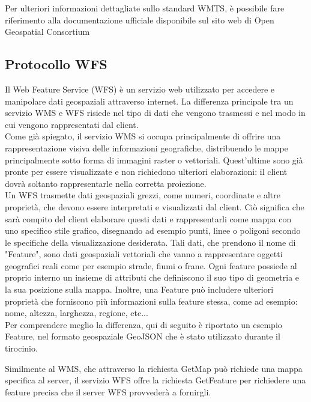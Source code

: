 
Per ulteriori informazioni dettagliate sullo standard WMTS, è possibile fare riferimento alla documentazione ufficiale disponibile sul sito web di Open Geospatial Consortium \cite{DocumentazioneWMTS}

\subsection{Protocollo WFS}

Il Web Feature Service (WFS) è un servizio web utilizzato per accedere e manipolare dati geospaziali attraverso internet. La differenza principale tra un servizio WMS e WFS risiede nel tipo di dati che vengono trasmessi e nel modo in cui vengono rappresentati dal client.
\\Come già spiegato, il servizio WMS si occupa principalmente di offrire una rappresentazione visiva delle informazioni geografiche, distribuendo le mappe principalmente sotto forma di immagini raster o vettoriali. Quest'ultime sono già pronte per essere visualizzate e non richiedono ulteriori elaborazioni: il client dovrà soltanto rappresentarle nella corretta proiezione.
\\Un WFS trasmette dati geospaziali grezzi, come numeri, coordinate e altre proprietà, che devono essere interpretati e visualizzati dal client. Ciò significa che sarà compito del client elaborare questi dati e rappresentarli come mappa con uno specifico stile grafico, disegnando ad esempio punti, linee o poligoni secondo le specifiche della visualizzazione desiderata. Tali dati, che prendono il nome di "Feature", sono dati geospaziali vettoriali che vanno a rappresentare oggetti geografici reali come per esempio strade, fiumi o frane. Ogni feature possiede al proprio interno un insieme di attributi che definiscono il suo tipo di geometria e la sua posizione sulla mappa. Inoltre, una Feature può includere ulteriori proprietà che forniscono più informazioni sulla feature stessa, come ad esempio: nome, altezza, larghezza, regione, etc...
\\Per comprendere meglio la differenza, qui di seguito è riportato un esempio Feature, nel formato geospaziale GeoJSON che è stato utilizzato durante il tirocinio.

Similmente al WMS, che attraverso la richiesta GetMap può richiede una mappa specifica al server, il servizio WFS offre la richiesta GetFeature per richiedere una feature precisa che il server WFS provvederà a fornirgli.
